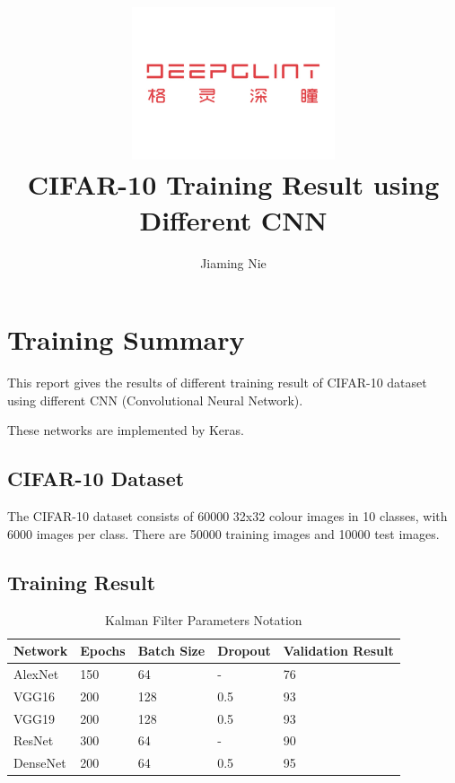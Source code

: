 \documentclass[11pt, a4paper]{article}
\title{\includegraphics[width=0.45\textwidth]{dg}
        \\CIFAR-10 Training Result using Different CNN }          %
\author{Jiaming Nie}                    %
\begin{document}
\begin{titlepage}
	
\maketitle
{} %




\thispagestyle{empty}  %

\end{titlepage}









\section{Training Summary}

This report gives the results of different training result of CIFAR-10 dataset using different CNN (Convolutional Neural Network).

These networks are implemented by Keras. 

\subsection{CIFAR-10 Dataset}

The CIFAR-10 dataset consists of 60000 32x32 colour images in 10 classes, with 6000 images per class. There are 50000 training images and 10000 test images. 

\subsection{Training Result}

\begin{table}[htbp] 
	\begin{center}
		\caption{Kalman Filter Parameters Notation}
		\begin{tabular}{|l|l|l|l|l|} \hline
		Network & Epochs & Batch Size & Dropout & Validation Result \\ \hline
		AlexNet &   150    &  64  &   -  & 76 \\ \hline
		VGG16  &  200     & 128    & 0.5     &  93 \\ \hline
		VGG19  & 200    & 128     & 0.5     & 93 \\ \hline
		ResNet &    300  & 64     &  -    & 90 \\ \hline 
		DenseNet &  200  & 64    &  0.5   & 95 \\ \hline
		
		\end{tabular}
		
		\label{tab:kf_meaning}
	\end{center}
\end{table}
\end{document}
